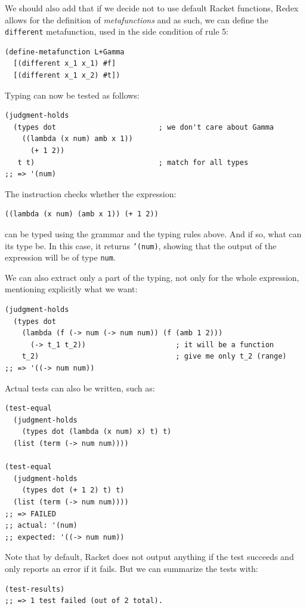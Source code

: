 We should also add that if we decide not to use default Racket functions,
Redex allows for the definition of \emph{metafunctions} and as such, we can
define the \texttt{different} metafunction, used in the side condition of
rule 5:
{
  \small
\begin{verbatim}
(define-metafunction L+Gamma
  [(different x_1 x_1) #f]
  [(different x_1 x_2) #t])
\end{verbatim}
}

Typing can now be tested as follows:
{
  \small
\begin{verbatim}
(judgment-holds
  (types dot                        ; we don't care about Gamma
    ((lambda (x num) amb x 1))
      (+ 1 2))
   t t)                             ; match for all types
;; => '(num)
\end{verbatim}
}

The instruction checks whether the expression:
{
  \small
\begin{verbatim}
((lambda (x num) (amb x 1)) (+ 1 2))
\end{verbatim}
}
can be typed using the grammar and the typing rules above. And if so,
what can its type be. In this case, it returns \texttt{'(num)}, showing
that the output of the expression will be of type \texttt{num}.

We can also extract only a part of the typing, not only for the whole
expression, mentioning explicitly what we want:
{
  \small
\begin{verbatim}
(judgment-holds
  (types dot
    (lambda (f (-> num (-> num num)) (f (amb 1 2)))
      (-> t_1 t_2))                     ; it will be a function
    t_2)                                ; give me only t_2 (range)
;; => '((-> num num))
\end{verbatim}
}

Actual tests can also be written, such as:
{
  \small
\begin{verbatim}
(test-equal
  (judgment-holds
    (types dot (lambda (x num) x) t) t)
  (list (term (-> num num))))

(test-equal
  (judgment-holds
    (types dot (+ 1 2) t) t)
  (list (term (-> num num))))
;; => FAILED
;; actual: '(num)
;; expected: '((-> num num))
\end{verbatim}
}

Note that by default, Racket does not output anything if the test succeeds
and only reports an error if it fails. But we can summarize the tests
with:
{
  \small
\begin{verbatim}
(test-results)
;; => 1 test failed (out of 2 total).
\end{verbatim}
}

